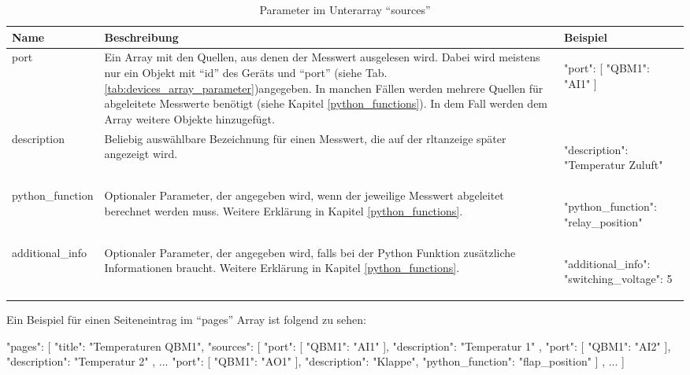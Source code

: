 \begin{enumerate}
	\begin{table}[H]
		\caption{Parameter im Unterarray \enquote{sources}}
		\label{tab:sources_array_parameter}
			\begin{tabular}{p{} p{} | p{}}
			\toprule
			\textbf{Name} & \textbf{Beschreibung} & \textbf{Beispiel} \\
			\midrule
			port                & Ein Array mit den Quellen, aus denen der Messwert ausgelesen wird. Dabei wird meistens nur ein Objekt mit \enquote{id} des Geräts und \enquote{port} (siehe Tab. \ref{tab:devices_array_parameter})angegeben. In manchen Fällen werden mehrere Quellen für abgeleitete Messwerte benötigt (siehe Kapitel \ref{python_functions}). In dem Fall werden dem Array weitere Objekte hinzugefügt. &  
			\begin{jsonTable}
"port": [
	{ "QBM1": "AI1" }
]
			\end{jsonTable} 
			\\
			description         & Beliebig auswählbare Bezeichnung für einen Messwert, die auf der \acs{rltanzeige} später angezeigt wird. & 
			\begin{jsonTable}
"description": "Temperatur Zuluft"
			\end{jsonTable}  
			\\
			python\_function    & Optionaler Parameter, der angegeben wird, wenn der jeweilige Messwert abgeleitet berechnet werden muss. Weitere Erklärung in Kapitel \ref{python_functions}. & 
			\begin{jsonTable}
"python_function": "relay_position"
			\end{jsonTable} 
			\\
			additional\_info    & Optionaler Parameter, der angegeben wird, falls bei der Python Funktion zusätzliche Informationen braucht. Weitere Erklärung in Kapitel \ref{python_functions}. & 
			\begin{jsonTable}
"additional_info": { "switching_voltage": 5 }
			\end{jsonTable} 
			\\
			\bottomrule
		\end{tabular}
	\end{table} 
		
	Ein Beispiel für einen Seiteneintrag im \enquote{pages} Array ist folgend zu sehen:
	
	\begin{jsoncode}
"pages": [
	{
		"title": "Temperaturen QBM1",
		"sources": [
		{
			"port": [{ "QBM1": "AI1" }],
			"description": "Temperatur 1"
		},
		{
			"port": [{ "QBM1": "AI2" }],
			"description": "Temperatur 2"
		},
		...
		{
			"port": [{ "QBM1": "AO1" }],
			"description": "Klappe",
			"python_function": "flap_position"
		}
		]
	},
	...
]
	\end{jsoncode}
	

\end{enumerate}
